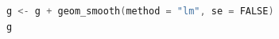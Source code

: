 \begin{lstlisting}[language=c++,label={code:11_03},caption={回帰線を引く}]
g <- g + geom_smooth(method = "lm", se = FALSE)
g
\end{lstlisting}
